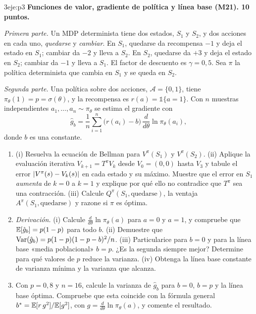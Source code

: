 \begin{ejercicio}{3}{eje:p3}
\textbf{Funciones de valor, gradiente de política y línea base (M21). 10 puntos.}

\emph{Primera parte.} Un MDP determinista tiene dos estados, $S_1$ y $S_2$, y dos acciones en cada uno, \emph{quedarse} y \emph{cambiar}. En $S_1$, quedarse da recompensa $-1$ y deja el estado en $S_1$; cambiar da $-2$ y lleva a $S_2$. En $S_2$, quedarse da $+3$ y deja el estado en $S_2$; cambiar da $-1$ y lleva a $S_1$. El factor de descuento es $\gamma=0{,}5$. Sea $\pi$ la política determinista que cambia en $S_1$ y se queda en $S_2$.

\emph{Segunda parte.} Una política sobre dos acciones, $\mathcal{A}=\{0,1\}$, tiene $\pi_\theta(1)=p=\sigma(\theta)$, y la recompensa es $r(a)=\mathbb{1}\{a=1\}$. Con $n$ muestras independientes $a_1,\dots,a_n\sim\pi_\theta$ se estima el gradiente con
\[
\hat g_b=\frac1n\sum_{i=1}^{n}\bigl(r(a_i)-b\bigr)\,\frac{d}{d\theta}\ln\pi_\theta(a_i),
\]
donde $b$ es una constante.
\begin{enumerate}[label=(\alph*)]
  \item {} (i) Resuelva la ecuación de Bellman para $V^{\pi}(S_1)$ y $V^{\pi}(S_2)$. (ii) Aplique la evaluación iterativa $V_{k+1}=T^{\pi}V_k$ desde $V_0=(0,0)$ hasta $V_3$ y tabule el error $\lvert V^{\pi}(s)-V_k(s)\rvert$ en cada estado y su máximo. Muestre que el error en $S_1$ \emph{aumenta} de $k=0$ a $k=1$ y explique por qué ello no contradice que $T^{\pi}$ sea una contracción. (iii) Calcule $Q^{\pi}(S_1,\text{quedarse})$, la ventaja $A^{\pi}(S_1,\text{quedarse})$ y razone si $\pi$ es óptima.
  \item {} \emph{Derivación.} (i) Calcule $\frac{d}{d\theta}\ln\pi_\theta(a)$ para $a=0$ y $a=1$, y compruebe que $\mathbb{E}[\hat g_b]=p(1-p)$ para todo $b$. (ii) Demuestre que $\operatorname{Var}(\hat g_b)=p(1-p)(1-p-b)^{2}/n$. (iii) Particularice para $b=0$ y para la línea base «media poblacional» $b=p$. ¿Es la segunda siempre mejor? Determine para qué valores de $p$ reduce la varianza. (iv) Obtenga la línea base constante de varianza mínima y la varianza que alcanza.
  \item {} Con $p=0{,}8$ y $n=16$, calcule la varianza de $\hat g_b$ para $b=0$, $b=p$ y la línea base óptima. Compruebe que esta coincide con la fórmula general $b^{*}=\mathbb{E}[r\,g^{2}]/\mathbb{E}[g^{2}]$, con $g=\frac{d}{d\theta}\ln\pi_\theta(a)$, y comente el resultado.
\end{enumerate}
\end{ejercicio}

